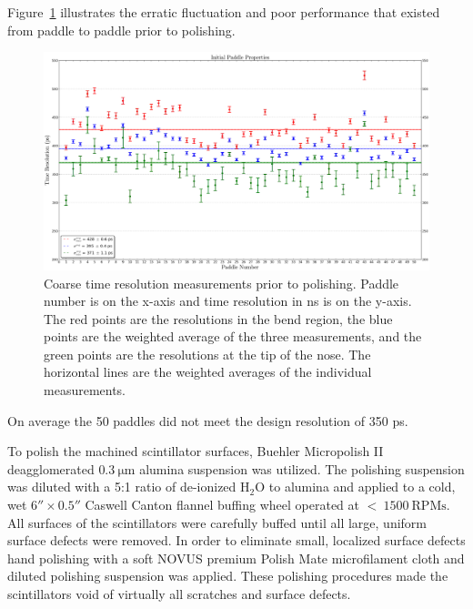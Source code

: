 Figure~\ref{fig:Initial_Paddle_Prop_UW} illustrates the erratic fluctuation and poor performance that existed from paddle to paddle prior to polishing. 
\begin{figure}[!htb]
	\centering
	\includegraphics[width=1.0\columnwidth]{fabrication/figs/Initial_Paddle_Prop_UW}
	\caption[Coarse time resolution measurements prior to polishing]{Coarse time resolution measurements prior to polishing. Paddle number is on the x-axis and time resolution in ns is on the y-axis. The red points are the resolutions in the bend region, the blue points are the weighted average of the three measurements, and the green points are the resolutions at the tip of the nose.  The horizontal lines are the weighted averages of the individual measurements.}
	\label{fig:Initial_Paddle_Prop_UW}
\end{figure}
On average the 50 paddles did not meet the design resolution of 350 ps.

To polish the machined scintillator surfaces, Buehler Micropolish II deagglomerated $\mathrm{0.3\ \mu m}$ alumina suspension was utilized\cite{buehler}.  The polishing suspension was diluted with a 5:1 ratio of de-ionized $\mathrm{H_{2}O}$ to alumina and applied to a cold, wet $6'' \times 0.5''$ Caswell Canton flannel buffing wheel\cite{caswell} operated at $\mathrm{<\ 1500~RPMs}$. All surfaces of the scintillators were carefully buffed until all large, uniform surface defects were removed. In order to eliminate small, localized surface defects hand polishing with a soft NOVUS premium Polish Mate microfilament cloth\cite{novus} and diluted polishing suspension was applied.  These polishing procedures made the scintillators void of virtually all scratches and surface defects.

